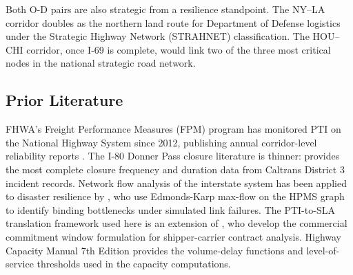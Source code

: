Both O-D pairs are also strategic from a resilience standpoint. The NY--LA corridor doubles as the northern land route for Department of Defense logistics under the Strategic Highway Network (STRAHNET) classification. The HOU--CHI corridor, once I-69 is complete, would link two of the three most critical nodes in the national strategic road network.

\subsection{Prior Literature}

FHWA's Freight Performance Measures (FPM) program has monitored PTI on the National Highway System since 2012, publishing annual corridor-level reliability reports \citep{FHWA_freight2023}. The I-80 Donner Pass closure literature is thinner: \citet{Caltrans2023} provides the most complete closure frequency and duration data from Caltrans District 3 incident records. Network flow analysis of the interstate system has been applied to disaster resilience by \citet{ROUTE_A1}, who use Edmonds-Karp max-flow on the HPMS graph to identify binding bottlenecks under simulated link failures. The PTI-to-SLA translation framework used here is an extension of \citet{ROUTE_A2}, who develop the commercial commitment window formulation for shipper-carrier contract analysis. Highway Capacity Manual 7th Edition \citep{HCM7} provides the volume-delay functions and level-of-service thresholds used in the capacity computations.
